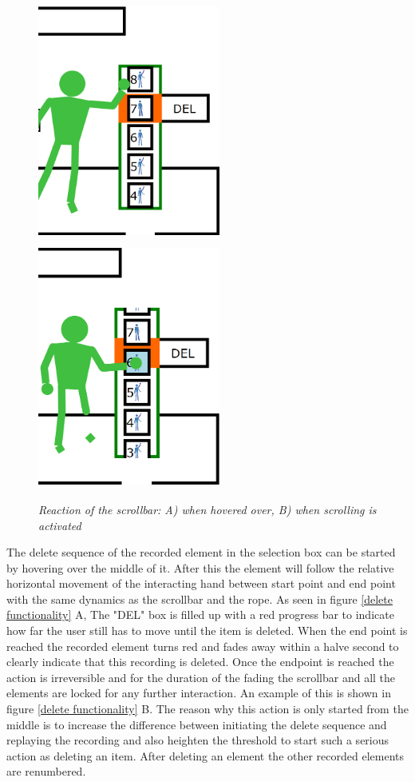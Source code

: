 \begin{figure}[H]
	\begin{center}
		\includegraphics[width=6cm, height=8cm]{figures/9_hover_scrollbar.png}
		\includegraphics[width=6cm, height=8cm]{figures/10_scroll_scrollbar.png}
		\caption{\emph{Reaction of the scrollbar: A) when hovered over, B) when scrolling is activated}}
		\label{scroll functionality}
	\end{center}
\end{figure}

The delete sequence of the recorded element in the selection box can be started by hovering over the middle of it. After this the element will follow the relative horizontal movement of the interacting hand between start point and end point with the same dynamics as the scrollbar and the rope. As seen in figure \ref{delete functionality} A, The "DEL" box is filled up with a red progress bar to indicate how far the user still has to move until the item is deleted. When the end point is reached the recorded element turns red and fades away within a halve second to clearly indicate that this recording is deleted. Once the endpoint is reached the action is irreversible and for the duration of the fading the scrollbar and all the elements are locked for any further interaction. An example of this is shown in figure \ref{delete functionality} B. The reason why this action is only started from the middle is to increase the difference between initiating the delete sequence and replaying the recording and also heighten the threshold to start such a serious action as deleting an item. After deleting an element the other recorded elements are renumbered.\\

